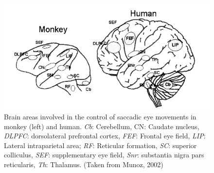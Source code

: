 \documentclass[a4paper, 12pt]{scrreprt}
\begin{document}
\begin{figure}
	\includegraphics[scale=0.5]{img/saccregions.png}
	\caption[Regions involved in saccadic eye movements]{\small{Brain areas involved in the control of saccadic eye movements in monkey (left) and human. \textit{Cb}: Cerebellum, CN: Caudate nucleus, \textit{DLPFC}: dorsolateral prefrontal cortex, \textit{FEF}: Frontal eye field, \textit{LIP}: Lateral intraparietal area; \textit{RF}: Reticular formation, \textit{SC}: superior colliculus, \textit{SEF}: supplementary eye field, \textit{Snr}: substantia nigra pars reticularis, \textit{Th}: Thalamus. (Taken from Munoz, 2002)}}
	\label{fig:saccregions}
\end{figure}
\end{document}
